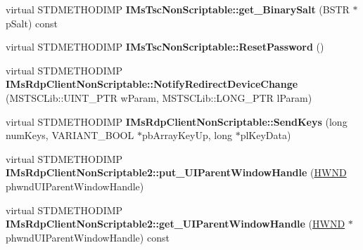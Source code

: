 \begin{DoxyCompactItemize}
virtual S\+T\+D\+M\+E\+T\+H\+O\+D\+I\+MP {\bfseries I\+Ms\+Tsc\+Non\+Scriptable\+::get\+\_\+\+Binary\+Salt} (B\+S\+TR $\ast$p\+Salt) const
\item 
\mbox{\label{class_s_e_a_l_e_d___adbbfcf2ad39aa9cc98677b08262f37a6}} 
virtual S\+T\+D\+M\+E\+T\+H\+O\+D\+I\+MP {\bfseries I\+Ms\+Tsc\+Non\+Scriptable\+::\+Reset\+Password} ()
\item 
\mbox{\label{class_s_e_a_l_e_d___ac5d36a2c7fc793d22a6617153dd9428e}} 
virtual S\+T\+D\+M\+E\+T\+H\+O\+D\+I\+MP {\bfseries I\+Ms\+Rdp\+Client\+Non\+Scriptable\+::\+Notify\+Redirect\+Device\+Change} (M\+S\+T\+S\+C\+Lib\+::\+U\+I\+N\+T\+\_\+\+P\+TR w\+Param, M\+S\+T\+S\+C\+Lib\+::\+L\+O\+N\+G\+\_\+\+P\+TR l\+Param)
\item 
\mbox{\label{class_s_e_a_l_e_d___aad323ad805b347cb56658bfe817c5b93}} 
virtual S\+T\+D\+M\+E\+T\+H\+O\+D\+I\+MP {\bfseries I\+Ms\+Rdp\+Client\+Non\+Scriptable\+::\+Send\+Keys} (long num\+Keys, V\+A\+R\+I\+A\+N\+T\+\_\+\+B\+O\+OL $\ast$pb\+Array\+Key\+Up, long $\ast$pl\+Key\+Data)
\item 
\mbox{\label{class_s_e_a_l_e_d___a846a3526e59cdcd2022254a0f55b9580}} 
virtual S\+T\+D\+M\+E\+T\+H\+O\+D\+I\+MP {\bfseries I\+Ms\+Rdp\+Client\+Non\+Scriptable2\+::put\+\_\+\+U\+I\+Parent\+Window\+Handle} (\hyperlink{interfacevoid}{H\+W\+ND} phwnd\+U\+I\+Parent\+Window\+Handle)
\item 
\mbox{\label{class_s_e_a_l_e_d___a991c9ec637b48d14b99251031c01e1e9}} 
virtual S\+T\+D\+M\+E\+T\+H\+O\+D\+I\+MP {\bfseries I\+Ms\+Rdp\+Client\+Non\+Scriptable2\+::get\+\_\+\+U\+I\+Parent\+Window\+Handle} (\hyperlink{interfacevoid}{H\+W\+ND} $\ast$phwnd\+U\+I\+Parent\+Window\+Handle) const
\end{DoxyCompactItemize}
